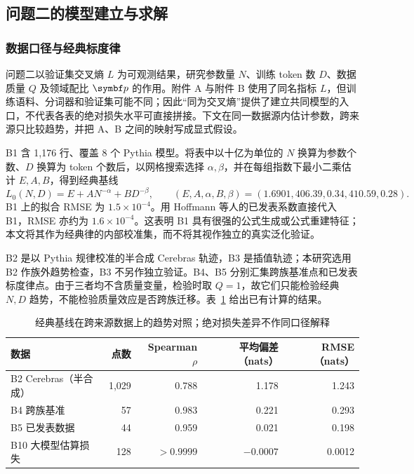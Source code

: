 \subsection{问题二的模型建立与求解}

\subsubsection{数据口径与经典标度律}

问题二以验证集交叉熵 $L$ 为可观测结果，研究参数量 $N$、训练 token 数 $D$、数据质量 $Q$ 及领域配比 $\bp$ 的作用。附件 A 与附件 B 使用了同名指标 $L$，但训练语料、分词器和验证集可能不同；因此“同为交叉熵”提供了建立共同模型的入口，不代表各表的绝对损失水平可直接拼接。下文在同一数据源内估计参数，跨来源只比较趋势，并把 A、B 之间的映射写成显式假设。

B1 含 1{,}176 行、覆盖 8 个 Pythia 模型。将表中以十亿为单位的 $N$ 换算为参数个数、$D$ 换算为 token 个数后，以网格搜索选择 $\alpha,\beta$，并在每组指数下最小二乘估计 $E,A,B$，得到经典基线
\begin{equation}
L_0(N,D)=E+AN^{-\alpha}+BD^{-\beta},\qquad
(E,A,\alpha,B,\beta)=(1.6901,406.39,0.34,410.59,0.28).
\label{eq:chinchilla}
\end{equation}
B1 上的拟合 RMSE 为 $1.5\times10^{-4}$。用 Hoffmann 等人的已发表系数直接代入 B1，RMSE 亦约为 $1.6\times10^{-4}$\cite{hoffmann}。这表明 B1 具有很强的公式生成或公式重建特征；本文将其作为经典律的内部校准集，而不将其视作独立的真实泛化验证。

B2 是以 Pythia 规律校准的半合成 Cerebras 轨迹，B3 是插值轨迹；本研究选用 B2 作族外趋势检查，B3 不另作独立验证。B4、B5 分别汇集跨族基准点和已发表标度律点。由于三者均不含质量变量，检验时取 $Q=1$，故它们只能检验经典 $N,D$ 趋势，不能检验质量效应是否跨族迁移。表~\ref{tab:q2_cross} 给出已有计算的结果。

\begin{table}[H]
\centering\small
\caption{经典基线在跨来源数据上的趋势对照；绝对损失差异不作同口径解释}
\label{tab:q2_cross}
\begin{tabular}{lrrrr}
\toprule
数据 & 点数 & Spearman $\rho$ & 平均偏差（nats） & RMSE（nats）\\
\midrule
B2 Cerebras（半合成） & 1{,}029 & 0.788 & 1.178 & 1.243\\
B4 跨族基准 & 57 & 0.983 & 0.221 & 0.293\\
B5 已发表数据 & 44 & 0.959 & 0.021 & 0.198\\
B10 大模型估算损失 & 128 & $>0.9999$ & $-0.0007$ & 0.0012\\
\bottomrule
\end{tabular}
\end{table}

